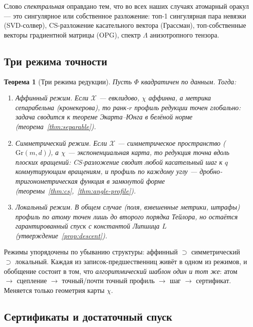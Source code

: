 \documentclass[11pt,a4paper]{article}
\newcommand{\Gr}{\mathrm{Gr}}
\theoremstyle{plain}
\newtheorem{theorem}{Теорема}[section]
\theoremstyle{definition}
\theoremstyle{remark}
\begin{document}
Слово \emph{спектральная} оправдано тем, что во всех наших случаях атомарный
оракул --- это сингулярное или собственное разложение: топ-1 сингулярная пара
невязки (SVD-солвер), CS-разложение касательного вектора (Грассман), топ-собственные
векторы градиентной матрицы (OPG), спектр $\Lambda$ анизотропного тензора.

\subsection{Три режима точности}

\begin{theorem}[Три режима редукции]\label{thm:three-modes}
Пусть $\Phi$ квадратичен по данным. Тогда:
\begin{enumerate}[label=(\Alph*),leftmargin=2.2em]
\item \emph{Аффинный режим.} Если $\mathcal X$ --- евклидово, $\chi$ аффинна, а
метрика сепарабельна (кронекерова), то ранк-$r$ профиль редукции точен
глобально: задача сводится к теореме Экарта--Юнга в белёной норме
(теорема~\ref{thm:separable}).
\item \emph{Симметрический режим.} Если $\mathcal X$ --- симметрическое
пространство ($\Gr(m,d)$), а $\chi$ --- экспоненциальная карта, то редукция точна
вдоль плоских вращений: CS-разложение сводит любой касательный шаг к $q$
коммутирующим вращениям, и профиль по каждому углу --- дробно-тригонометрическая
функция в замкнутой форме (теоремы~\ref{thm:cs},~\ref{thm:angle-profile}).
\item \emph{Локальный режим.} В общем случае (поля, взвешенные метрики, штрафы)
профиль по атому точен лишь до второго порядка Тейлора, но остаётся
\emph{гарантированный спуск} с константой Липшица $L$
(утверждение~\ref{prop:descent}).
\end{enumerate}
\end{theorem}

Режимы упорядочены по убыванию структуры: аффинный $\supset$ симметрический
$\supset$ локальный. Каждая из записок-предшественниц живёт в одном из режимов,
и обобщение состоит в том, что \emph{алгоритмический шаблон один и тот же}:
атом $\to$ сцепление $\to$ точный/почти точный профиль $\to$ шаг $\to$
сертификат. Меняется только геометрия карты $\chi$.

\subsection{Сертификаты и достаточный спуск}
\end{document}
